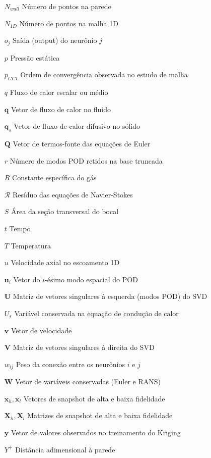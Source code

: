 \begin{itemize}
\item[$N_{wall}$] Número de pontos na parede
\item[$N_{1D}$] Número de pontos na malha 1D
\item[$o_j$] Saída (output) do neurônio $j$
\item[$p$] Pressão estática
\item[$p_{GCI}$] Ordem de convergência observada no estudo de malha
\item[$q$] Fluxo de calor escalar ou médio
\item[$\mathbf{q}$] Vetor de fluxo de calor no fluido
\item[$\mathbf{q}_s$] Vetor de fluxo de calor difusivo no sólido
\item[$\mathbf{Q}$] Vetor de termos-fonte das equações de Euler
\item[$r$] Número de modos POD retidos na base truncada
\item[$R$] Constante específica do gás
\item[$\mathcal{R}$] Resíduo das equações de Navier-Stokes
\item[$S$] Área da seção transversal do bocal
\item[$t$] Tempo
\item[$T$] Temperatura
\item[$u$] Velocidade axial no escoamento 1D
\item[$\mathbf{u}_i$] Vetor do $i$-ésimo modo espacial do POD
\item[$\mathbf{U}$] Matriz de vetores singulares à esquerda (modos POD) do SVD
\item[$U_s$] Variável conservada na equação de condução de calor
\item[$\mathbf{v}$] Vetor de velocidade
\item[$\mathbf{V}$] Matriz de vetores singulares à direita do SVD
\item[$w_{ij}$] Peso da conexão entre os neurônios $i$ e $j$
\item[$\mathbf{W}$] Vetor de variáveis conservadas (Euler e RANS)
\item[$\mathbf{x}_h, \mathbf{x}_l$] Vetores de snapshot de alta e baixa fidelidade
\item[$\mathbf{X}_h, \mathbf{X}_l$] Matrizes de snapshot de alta e baixa fidelidade
\item[$\mathbf{y}$] Vetor de valores observados no treinamento do Kriging
\item[$Y^{+}$] Distância adimensional à parede
\end{itemize}

